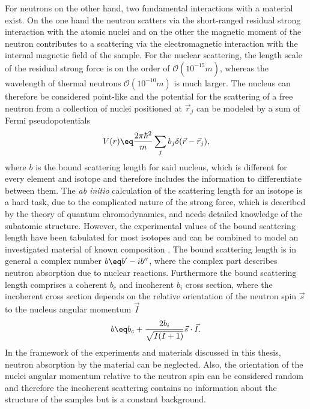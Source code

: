 \documentclass[\main/dresen_thesis.tex]{subfiles}
\begin{document}
    For neutrons on the other hand, two fundamental interactions with a material exist.
    On the one hand the neutron scatters via the short-ranged residual strong interaction with the atomic nuclei and on the other the magnetic moment of the neutron contributes to a scattering via the electromagnetic interaction with the internal magnetic field of the sample.
    For the nuclear scattering, the length scale of the residual strong force is on the order of $\mathcal{O} (10^{-15} \unit{m})$, whereas the wavelength of thermal neutrons $\mathcal{O} (10^{-10} \unit{m})$ is much larger.
    The nucleus can therefore be considered point-like and the potential for the scattering of a free neutron from a collection of nuclei positioned at $\vec{r}_j$ can be modeled by a sum of Fermi pseudopotentials
    \begin{align}
      V(r) \eq \frac{2 \pi \hbar^2}{m} \sum_j b_j \delta(\vec{r} - \vec{r}_j),\label{eq:theoreticalBackground:scattering:scatteringTheory:neutronScatteringPotentialSum}
    \end{align}
    where $b$ is the bound scattering length for said nucleus, which is different for every element and isotope and therefore includes the  information to differentiate between them.
    The \textit{ab initio} calculation of the scattering length for an isotope is a hard task, due to the complicated nature of the strong force, which is described by the theory of quantum chromodynamics, and needs detailed knowledge of the subatomic structure.
    However, the experimental values of the bound scattering length have been tabulated for most isotopes and can be combined to model an investigated material of known composition \cite{Sears_1992_Neutr}.
    The bound scattering length is in general a complex number $b \eq b^\prime - i b^{\prime \prime}$, where the complex part describes neutron absorption due to nuclear reactions.
    Furthermore the bound scattering length comprises a coherent $b_c$ and incoherent $b_i$ cross section, where the incoherent cross section depends on the relative orientation of the neutron spin $\vec{s}$ to the nucleus angular momentum $\vec{I}$
    \begin{align}
      b \eq b_c + \frac{2 b_i}{\sqrt{I(I+1)}} \vec{s} \cdot \vec{I}.
    \end{align}
    In the framework of the experiments and materials discussed in this thesis, neutron absorption by the material can be neglected.
    Also, the orientation of the nuclei angular momentum relative to the neutron spin can be considered random and therefore the incoherent scattering contains no information about the structure of the samples but is a constant background.
\end{document}
